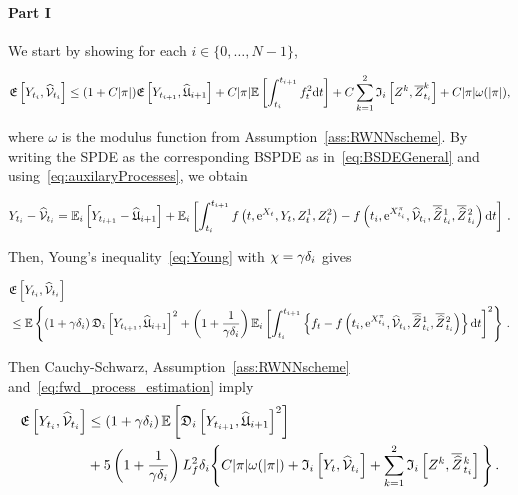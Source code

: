 \paragraph{\textbf{Part I}} We start by showing for each $i\in\{0, \dots, N-1\}$,
\begin{small}
\begin{equation}\label{eq:convergence_part1_result}
\mathfrak{E}\left[Y_{t_i}, \widehat{\mathcal{V}}_{t_i}\right]
\leq (1+C|\pi|) \mathfrak{E}\left[Y_{t_{i+1}}, \widehat{\mathfrak{U}}_{i+1}\right]
 +C|\pi| \mathbb{E}\left[\int_{t_i}^{t_{i+1}}f_{t}^2 \mathrm{d} t\right] 
 + C \sum_{k=1}^{2}\mathfrak{I}_i\left[Z^k, \overline{Z}^{k}_{t_i}\right] + C |\pi|\omega(|\pi|),
\end{equation}
\end{small}%
where $\omega$ is the modulus function from Assumption~\ref{ass:RWNNscheme}. 
By writing the SPDE as the corresponding BSPDE as in~\eqref{eq:BSDEGeneral} and using~\eqref{eq:auxilaryProcesses}, we obtain
\begin{small}
\begin{equation}
Y_{t_i}-\widehat{\mathcal{V}}_{t_i} = 
\mathbb{E}_i\left[Y_{t_{i+1}}-\widehat{\mathfrak{U}}_{i+1}\right]+\mathbb{E}_i\left[\int_{t_i}^{t_{i+1}} f\left(t, \mathrm{e}^{X_t}, Y_t, Z^1_t, Z^2_t\right)-f\left(t_i, \mathrm{e}^{X^\pi_{t_i}}, \widehat{\mathcal{V}}_{t_i}, \overline{\widehat{Z}}\kern0.1em^{1}_{t_{i}}, \overline{\widehat{Z}}\kern0.1em^{2}_{t_{i}}\right) \mathrm{d} t\right]\,.
\end{equation}
\end{small}%
Then, Young's inequality~\eqref{eq:Young} with $\chi = \gamma\delta_{i}$ gives
\begin{small}
\begin{equation}
\begin{aligned}
&\mathfrak{E}\left[Y_{t_i}, \widehat{\mathcal{V}}_{t_i}\right] \\
& \leq \mathbb{E}\left\{\left(1+\gamma \delta_{i} \right)
\mathfrak{D}_i\left[Y_{t_{i+1}}, \widehat{\mathfrak{U}}_{i+1}\right]^{2}
 + \left(1+\frac{1}{\gamma \delta_{i} }\right)\mathbb{E}_i\left[\int_{t_i}^{t_{i+1}}\left\{
f_{t}-f\left(t_i, \mathrm{e}^{X^\pi_{t_i}}, \widehat{\mathcal{V}}_{t_i}, \overline{\widehat{Z}}\kern0.1em^{1}_{t_{i}}, \overline{\widehat{Z}}\kern0.1em^{2}_{t_{i}}\right)\right\} \mathrm{d} t\right]^2\right\}\,.
\end{aligned}
\end{equation}
\end{small}%
Then Cauchy-Schwarz, Assumption~\ref{ass:RWNNscheme} and~\eqref{eq:fwd_process_estimation} imply
\begin{align}\label{eq:convergence_part1_0}
\begin{split}
\mathfrak{E}\left[Y_{t_i}, \widehat{\mathcal{V}}_{t_i}\right] &\leq \left(1+\gamma \delta_{i} \right) \mathbb{E}\left[\mathfrak{D}_i\left[Y_{t_{i+1}}, \widehat{\mathfrak{U}}_{i+1}\right]^2\right] \\ 
& + 5\left(1+\frac{1}{\gamma \delta_{i} }\right) L_f^2 \delta_{i} \Bigg\{C |\pi| \omega(|\pi|)
+ \mathfrak{I}_i\left[Y_t, \widehat{\mathcal{V}}_{t_i}\right] + \sum_{k=1}^{2}\mathfrak{I}_i\left[Z^k, \overline{\widehat{Z}}\kern0.1em^{k}_{t_i}\right]\Bigg\}\,.
\end{split}
\end{align}
